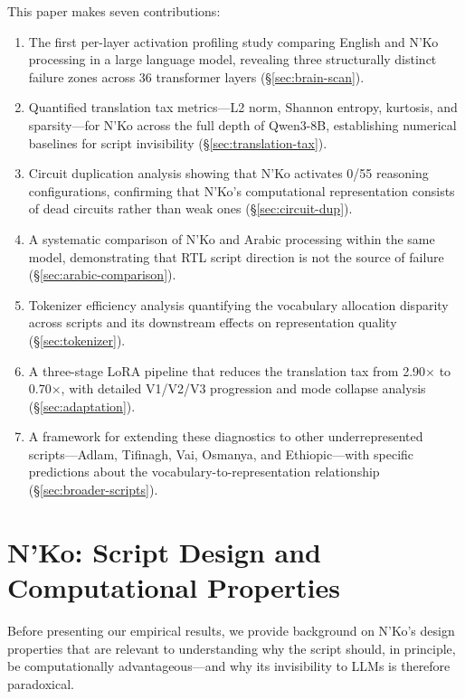 \documentclass[11pt]{article}
\begin{document}
This paper makes seven contributions:

\begin{enumerate}
\item The first per-layer activation profiling study comparing English and N'Ko processing in a large language model, revealing three structurally distinct failure zones across 36 transformer layers (\S\ref{sec:brain-scan}).
\item Quantified translation tax metrics---L2 norm, Shannon entropy, kurtosis, and sparsity---for N'Ko across the full depth of Qwen3-8B, establishing numerical baselines for script invisibility (\S\ref{sec:translation-tax}).
\item Circuit duplication analysis showing that N'Ko activates 0/55 reasoning configurations, confirming that N'Ko's computational representation consists of dead circuits rather than weak ones (\S\ref{sec:circuit-dup}).
\item A systematic comparison of N'Ko and Arabic processing within the same model, demonstrating that RTL script direction is not the source of failure (\S\ref{sec:arabic-comparison}).
\item Tokenizer efficiency analysis quantifying the vocabulary allocation disparity across scripts and its downstream effects on representation quality (\S\ref{sec:tokenizer}).
\item A three-stage LoRA pipeline that reduces the translation tax from 2.90$\times$ to 0.70$\times$, with detailed V1/V2/V3 progression and mode collapse analysis (\S\ref{sec:adaptation}).
\item A framework for extending these diagnostics to other underrepresented scripts---Adlam, Tifinagh, Vai, Osmanya, and Ethiopic---with specific predictions about the vocabulary-to-representation relationship (\S\ref{sec:broader-scripts}).
\end{enumerate}

\section{N'Ko: Script Design and Computational Properties}

Before presenting our empirical results, we provide background on N'Ko's design properties that are relevant to understanding why the script should, in principle, be computationally advantageous---and why its invisibility to LLMs is therefore paradoxical.
\end{document}
